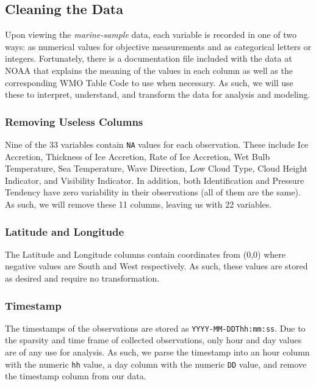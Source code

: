 \documentclass{article}
\begin{document}
\subsection{Cleaning the Data}

Upon viewing the \textit{marine-sample} data, each variable is recorded in one of two ways: as numerical values for objective measurements and as categorical letters or integers. Fortunately, there is a documentation file included with the data at NOAA \cite{noaaDatasetsClimate} that explains the meaning of the values in each column as well as the corresponding WMO Table Code \cite{WMOCodes2017} to use when necessary. As such, we will use these to interpret, understand, and transform the data for analysis and modeling.

\subsubsection*{Removing Useless Columns}

Nine of the 33 variables contain \texttt{NA} values for each observation. These include Ice Accretion, Thickness of Ice Accretion, Rate of Ice Accretion, Wet Bulb Temperature, Sea Temperature, Wave Direction, Low Cloud Type, Cloud Height Indicator, and Visibility Indicator. In addition, both Identification and Pressure Tendency have zero variability in their observations (all of them are the same). As such, we will remove these 11 columns, leaving us with 22 variables.

\subsubsection*{Latitude and Longitude}

The Latitude and Longitude columns contain coordinates from (0,0) where negative values are South and West respectively. As such, these values are stored as desired and require no transformation.

\subsubsection*{Timestamp}

The timestamps of the observations are stored as \texttt{YYYY-MM-DDThh:mm:ss}. Due to the sparsity and time frame of collected observations, only hour and day values are of any use for analysis. As such, we parse the timestamp into an hour column with the numeric \texttt{hh} value, a day column with the numeric \texttt{DD} value, and remove the timestamp column from our data.
\end{document}
